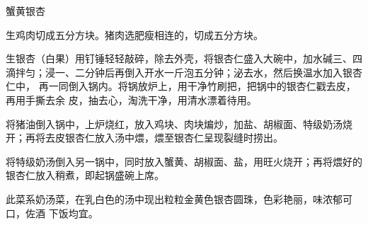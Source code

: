 \begin{recipe}{蟹黄银杏}

\ingredients


\preparation

\step 生鸡肉切成五分方块。猪肉选肥瘦相连的，切成五分方块。

\step 生银杏（白果）用钉锤轻轻敲碎，除去外壳，将银杏仁盛入大碗中，加水碱三、四
滴拌匀；浸一、二分钟后再倒入开水一斤泡五分钟；泌去水，然后换温水加入银杏仁中，
再一同倒入锅内。将锅放炉上，用干净竹刷把，把锅中的银杏仁戳去皮，再用手撕去余
皮，抽去心，淘洗干净，用清水漂着待用。

\step 将猪油倒入锅中，上炉烧红，放入鸡块、肉块煸炒，加盐、胡椒面、特级奶汤烧
开；再将去皮银杏仁放入汤中煨，煨至银杏仁呈现裂缝时捞出。

\step 将特级奶汤倒入另一锅中，同时放入蟹黄、胡椒面、盐，用旺火烧开；再将煨好的
银杏仁放入稍煮，即起锅盛碗上席。

\features

此菜系奶汤菜，在乳白色的汤中现出粒粒金黄色银杏圆珠，色彩艳丽，味浓郁可口，佐酒
下饭均宜。

\end{recipe}

